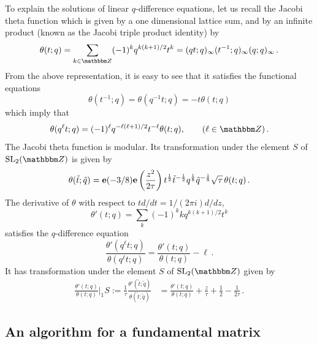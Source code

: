 \documentclass[12pt,reqno]{amsart}
\theoremstyle{definition}
\def\BZ{\mathbbm Z}
\def\SL{\mathrm{SL}}
\def\tq{\tilde{q}}
\def\be{\begin{equation}}
\def\ee{\end{equation}}
\def\e{\bold e}
\begin{document}
To explain the solutions of linear $q$-difference equations, let us recall
 the Jacobi theta function which is given by a one dimensional
lattice sum, and by an infinite product (known as the Jacobi triple product identity)
by
\be
\label{theta}
\theta(t;q)
=
\sum_{k\in\BZ}(-1)^{k}q^{k(k+1)/2}t^{k}
=
(qt;q)_{\infty}(t^{-1};q)_{\infty}(q;q)_{\infty} \,.
\ee
From the above representation, it is easy to see that it satisfies the functional
equations
\be
\label{theta.fun}
\theta(t^{-1};q)
=
\theta(q^{-1}t;q)
=
-t\theta(t;q)
\ee
which imply that
\be
\label{theta.fun2}
\theta(q^{\ell}t;q)
=
(-1)^{\ell}q^{-\ell(\ell+1)/2}t^{-\ell}\theta(t;q),
\qquad (\ell \in \BZ) \,.
\ee
The Jacobi theta function is modular. Its transformation under the element
$S$ of $\SL_2(\BZ)$ is given by
\be
\label{thetaS}
\theta(\tilde{t};\tilde{q})
= \e(-3/8)
\e\left(\frac{z^{2}}{2\tau}\right)t^{\frac{1}{2}}
\tilde{t}^{-\frac{1}{2}}q^{\frac{1}{8}}\tq^{-\frac{1}{8}}\sqrt{\tau} \,
\theta(t;q)\,.
\ee
The derivative of $\theta$ with respect to $t d/dt=1/(2 \pi  i) d/dz$,
\be
\theta'(t;q)
=
\sum_{k}(-1)^{k}kq^{k(k+1)/2}t^{k}
\ee
satisfies the $q$-difference equation
\be
\label{thetader}
\frac{\theta'(q^{\ell}t;q)}{\theta(q^{\ell}t;q)}
=
\frac{\theta'(t;q)}{\theta(t;q)}-\ell \,.
\ee
It has transformation under the element $S$ of $\SL_2(\BZ)$ given by
\be
\label{S.mod.thd}
\begin{aligned}
  \frac{\theta'(t;q)}{\theta(t;q)} \Big|_{1} S
  :=\frac{1}{\tau}\frac{\theta'(\tilde{t};\tq)}{\theta(\tilde{t};\tq)}
&=
\frac{\theta'(t;q)}{\theta(t;q)}+\frac{z}{\tau}+\frac{1}{2}-\frac{1}{2\tau}\,.
\end{aligned}
\ee

\subsection{An algorithm for a fundamental matrix}
\label{sub.algorithm}
\end{document}
